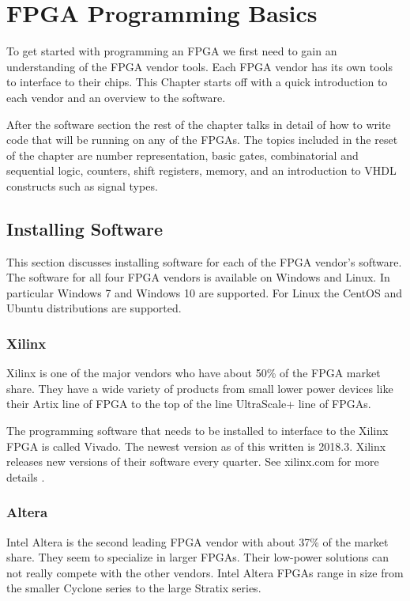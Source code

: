 \chapter{FPGA Programming Basics}

To get started with programming an \ac{FPGA} we first need to gain an understanding of the \ac{FPGA} vendor tools. Each \ac{FPGA} vendor has its own tools to interface to their chips. This Chapter starts off with a quick introduction to each vendor and an overview to the software. 

After the software section the rest of the chapter talks in detail of how to write code that will be running on any of the \ac{FPGA}s. The topics included in the reset of the chapter are number representation, basic gates, combinatorial and sequential logic, counters, shift registers, memory, and an introduction to \ac{VHDL} constructs such as signal types. 
	
\section{Installing Software}

This section discusses installing software for each of the \ac{FPGA} vendor's software. The software for all four \ac{FPGA} vendors is available on Windows and Linux. In particular Windows 7 and Windows 10 are supported. For Linux the CentOS and Ubuntu distributions are supported. 
	
\subsection{Xilinx}

Xilinx is one of the major vendors who have about 50\% of the \ac{FPGA} market share. They have a wide variety of products from small lower power devices like their Artix line of \ac{FPGA} to the top of the line UltraScale+ line of \ac{FPGA}s.

The programming software that needs to be installed to interface to the Xilinx \ac{FPGA} is called Vivado. The newest version as of this written is 2018.3. Xilinx releases new versions of their software every quarter. See xilinx.com for more details \cite{xilref}. 	
	
\subsection{Altera}

Intel Altera is the second leading \ac{FPGA} vendor with about 37\% of the market share. They seem to specialize in larger \ac{FPGA}s. Their low-power solutions can not really compete with the other vendors. Intel Altera \ac{FPGA}s range in size from the smaller Cyclone series to the large Stratix series. 

